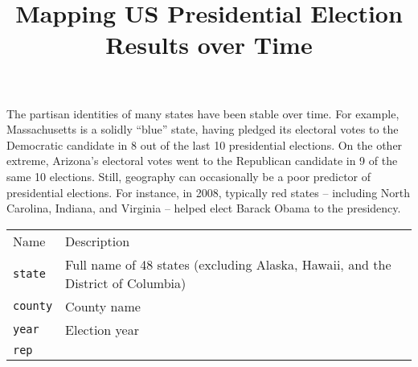 \documentclass[]{article}
\title{Mapping US Presidential Election Results over Time}
\author{}
\date{}
\begin{document}
\maketitle


The partisan identities of many states have been stable over time. For
example, Massachusetts is a solidly ``blue'' state, having pledged its
electoral votes to the Democratic candidate in 8 out of the last 10
presidential elections. On the other extreme, Arizona's electoral votes
went to the Republican candidate in 9 of the same 10 elections. Still,
geography can occasionally be a poor predictor of presidential
elections. For instance, in 2008, typically red states -- including
North Carolina, Indiana, and Virginia -- helped elect Barack Obama to
the presidency.

\begin{longtable}[c]{@{}ll@{}}
\toprule\addlinespace
\begin{minipage}[b]{0.19\columnwidth}\raggedright
Name
\end{minipage} & \begin{minipage}[b]{0.74\columnwidth}\raggedright
Description
\end{minipage}
\\\addlinespace
\midrule\endhead
\begin{minipage}[t]{0.19\columnwidth}\raggedright
\texttt{state}
\end{minipage} & \begin{minipage}[t]{0.74\columnwidth}\raggedright
Full name of 48 states (excluding Alaska, Hawaii, and the District of
Columbia)
\end{minipage}
\\\addlinespace
\begin{minipage}[t]{0.19\columnwidth}\raggedright
\texttt{county}
\end{minipage} & \begin{minipage}[t]{0.74\columnwidth}\raggedright
County name
\end{minipage}
\\\addlinespace
\begin{minipage}[t]{0.19\columnwidth}\raggedright
\texttt{year}
\end{minipage} & \begin{minipage}[t]{0.74\columnwidth}\raggedright
Election year
\end{minipage}
\\\addlinespace
\begin{minipage}[t]{0.19\columnwidth}\raggedright
\texttt{rep}
\end{minipage} & \begin{minipage}[t]{0.74\columnwidth}\raggedright

\end{minipage}
\end{longtable}
\end{document}
